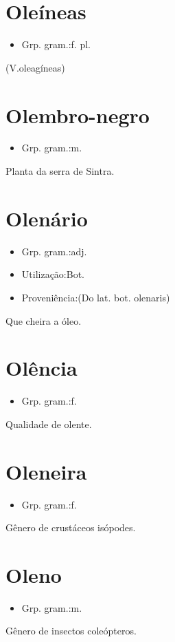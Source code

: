 \section{Oleíneas}
\begin{itemize}
\item {Grp. gram.:f. pl.}
\end{itemize}
(V.oleagíneas)
\section{Olembro-negro}
\begin{itemize}
\item {Grp. gram.:m.}
\end{itemize}
Planta da serra de Sintra.
\section{Olenário}
\begin{itemize}
\item {Grp. gram.:adj.}
\end{itemize}
\begin{itemize}
\item {Utilização:Bot.}
\end{itemize}
\begin{itemize}
\item {Proveniência:(Do lat. bot. \textunderscore olenaris\textunderscore )}
\end{itemize}
Que cheira a óleo.
\section{Olência}
\begin{itemize}
\item {Grp. gram.:f.}
\end{itemize}
Qualidade de olente.
\section{Oleneira}
\begin{itemize}
\item {Grp. gram.:f.}
\end{itemize}
Gênero de crustáceos isópodes.
\section{Oleno}
\begin{itemize}
\item {Grp. gram.:m.}
\end{itemize}
Gênero de insectos coleópteros.
